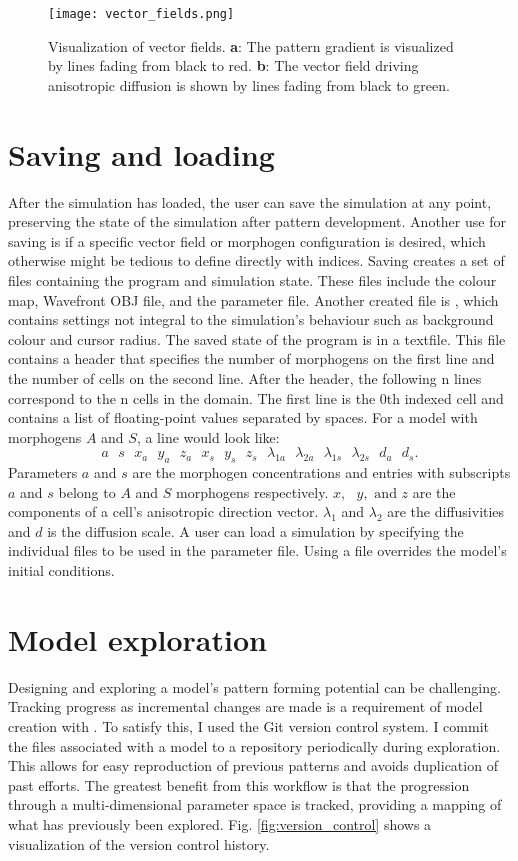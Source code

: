 \begin{figure}[ht]
	\centering
	\texttt{[image: vector\_fields.png]}	
	\caption[Visualization of vector fields]{Visualization of vector fields. \textbf{a}: The pattern gradient is visualized by lines fading from black to red. \textbf{b}: The vector field driving anisotropic diffusion is shown by lines fading from black to green.} 
	\label{fig:vector_fields}
\end{figure}

\section{Saving and loading}
After the simulation has loaded, the user can save the simulation at any point, preserving the state of the simulation after pattern development. Another use for saving is if a specific vector field or morphogen configuration is desired, which otherwise might be tedious to define directly with indices. Saving creates a set of files containing the program and simulation state. These files include the colour map, Wavefront OBJ file, and the parameter file. Another created file is , which contains settings not integral to the simulation's behaviour such as background colour and cursor radius. The saved state of the program is in a  textfile. This file contains a header that specifies the number of morphogens on the first line and the number of cells on the second line. After the header, the following n lines correspond to the n cells in the domain. The first line is the 0th indexed cell and contains a list of floating-point values separated by spaces. For a model with morphogens $A$ and $S$, a line would look like:
\[a\text{ }s\text{ }x_a\text{ }y_a\text{ }z_a\text{ }x_s\text{ }y_s\text{ }z_s\text{ }\lambda_{1a}\text{ }\lambda_{2a}\text{ }\lambda_{1s}\text{ }\lambda_{2s}\text{ }d_a\text{ }d_s.\]
Parameters $a$ and $s$ are the morphogen concentrations and entries with subscripts $a$ and $s$ belong to $A$ and $S$ morphogens respectively. $x,\text{ }y, \text{ and } z$ are the components of a cell's anisotropic direction vector. $\lambda_1$ and $\lambda_2$ are the diffusivities and $d$ is the diffusion scale. A user can load a simulation by specifying the individual files to be used in the parameter file. Using a  file overrides the model's initial conditions.

\section{Model exploration}
Designing and exploring a model's pattern forming potential can be challenging. Tracking progress as incremental changes are made is a requirement of model creation with \ProgramName{}. To satisfy this, I used the Git version control system. I commit the files associated with a model to a repository periodically during exploration. This allows for easy reproduction of previous patterns and avoids duplication of past efforts. The greatest benefit from this workflow is that the progression through a multi-dimensional parameter space is tracked, providing a mapping of what has previously been explored. Fig. \ref{fig:version_control} shows a visualization of the version control history.

